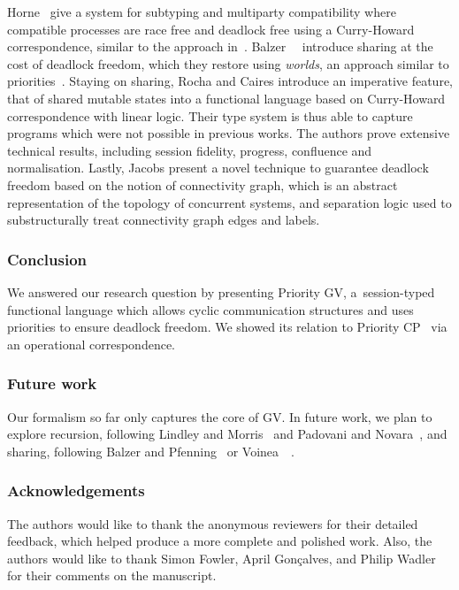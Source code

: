 Horne~\cite{Horne20} give a system for subtyping and multiparty compatibility where compatible processes are race free and deadlock free using a Curry-Howard correspondence, similar to the approach in~\cite{CiobanuH15}.
Balzer~\etal~\cite{balzerpfenning17} introduce sharing at the cost of deadlock freedom, which they restore using \emph{worlds}, an approach similar to priorities~\cite{balzertoninho19}.
Staying on sharing, Rocha and Caires \cite{rochacaires21} introduce an imperative feature, that of shared mutable states into a functional language based on Curry-Howard correspondence with linear logic. Their type system is thus able to capture programs which were not possible in previous works. The authors prove extensive technical results, including session fidelity, progress, confluence and
normalisation.
Lastly, Jacobs \etal \cite{JacobsBK22a} present a novel technique to guarantee deadlock freedom based on the notion of connectivity graph, which is an abstract representation of the topology of concurrent systems, and separation logic used to substructurally treat connectivity graph edges and labels.


\subsubsection*{Conclusion}
We answered our research question by presenting Priority GV, a~session-typed functional language which allows cyclic communication structures and uses priorities to ensure deadlock freedom. We showed its relation to Priority CP~\cite{dardhagay18extended} via an operational correspondence.

\subsubsection*{Future work}
Our formalism so far only captures the core of GV. In future work, we plan to explore recursion, following Lindley and Morris~\cite{lindleymorris16} and Padovani and Novara~\cite{padovaninovara15}, and sharing, following Balzer and Pfenning~\cite{balzerpfenning17} or Voinea~\etal~\cite{VoineaDG19}.

\subsubsection*{Acknowledgements}
The authors would like to thank the anonymous reviewers for their detailed feedback, which helped produce a more complete and polished work.
Also, the authors would like to thank Simon Fowler, April Gon\c{c}alves, and Philip Wadler for their comments on the manuscript.
